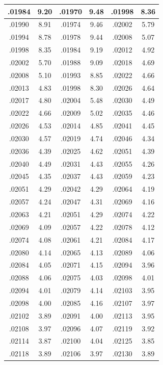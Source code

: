 \documentclass[10pt,twoside]{report}
\begin{document}
\begin{appendices}
\begin{longtable}{|c|c||c|c||c|c|}
.01984 & 9.20 & .01970 & 9.48 & .01998 & 8.36\\\hline
.01990 & 8.91 & .01974 & 9.46 & .02002 & 5.79\\\hline
.01994 & 8.78 & .01978 & 9.44 & .02008 & 5.07\\\hline
.01998 & 8.35 & .01984 & 9.19 & .02012 & 4.92\\\hline
.02002 & 5.70 & .01988 & 9.09 & .02018 & 4.69\\\hline
.02008 & 5.10 & .01993 & 8.85 & .02022 & 4.66\\\hline
.02013 & 4.83 & .01998 & 8.30 & .02026 & 4.64\\\hline
.02017 & 4.80 & .02004 & 5.48 & .02030 & 4.49\\\hline
.02022 & 4.66 & .02009 & 5.02 & .02035 & 4.46\\\hline
.02026 & 4.53 & .02014 & 4.85 & .02041 & 4.45\\\hline
.02030 & 4.57 & .02019 & 4.74 & .02046 & 4.34\\\hline
.02036 & 4.39 & .02025 & 4.62 & .02051 & 4.39\\\hline
.02040 & 4.49 & .02031 & 4.43 & .02055 & 4.26\\\hline
.02045 & 4.35 & .02037 & 4.43 & .02059 & 4.23\\\hline
.02051 & 4.29 & .02042 & 4.29 & .02064 & 4.19\\\hline
.02057 & 4.24 & .02047 & 4.31 & .02069 & 4.16\\\hline
.02063 & 4.21 & .02051 & 4.29 & .02074 & 4.22\\\hline
.02069 & 4.09 & .02057 & 4.22 & .02078 & 4.12\\\hline
.02074 & 4.08 & .02061 & 4.21 & .02084 & 4.17\\\hline
.02080 & 4.14 & .02065 & 4.13 & .02089 & 4.06\\\hline
.02084 & 4.05 & .02071 & 4.15 & .02094 & 3.96\\\hline
.02088 & 4.06 & .02075 & 4.03 & .02098 & 4.01\\\hline
.02094 & 4.01 & .02079 & 4.14 & .02103 & 3.95\\\hline
.02098 & 4.00 & .02085 & 4.16 & .02107 & 3.97\\\hline
.02102 & 3.89 & .02091 & 4.00 & .02113 & 3.95\\\hline
.02108 & 3.97 & .02096 & 4.07 & .02119 & 3.92\\\hline
.02114 & 3.87 & .02100 & 4.04 & .02125 & 3.85\\\hline
.02118 & 3.89 & .02106 & 3.97 & .02130 & 3.89\\\hline

\end{longtable}
\end{appendices}
\end{document}
